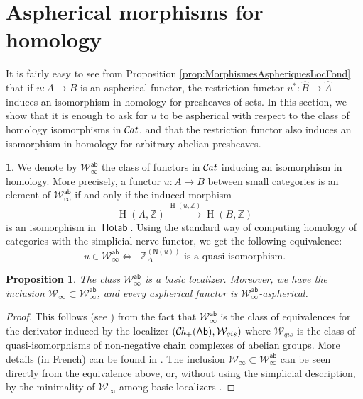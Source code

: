 \documentclass[10pt, english, a4paper, nothms]{amsart}
\theoremstyle{plain}
\newtheorem{prop}[theorem]{Proposition}
\theoremstyle{remark}
\theoremstyle{definition}
\newtheorem{paragr}[theorem]{}
\numberwithin{equation}{theorem}
\newcommand\Z{\mathbb{Z}}
\newcommand{\Cat}{{\mathcal{C}\mspace{-2.mu}\it{at}}}
\newcommand{\Ch}{{\mathcal{C}\mspace{-2.mu}\it{h}_{+}}}
\newcommand{\pref}[1]{{\widehat{ #1 }}}
\newcommand{\W}{\mathcal{W}}
\newcommand{\Hotab}{\operatorname{\mathsf{Hotab}}}
\newcommand{\Ab}{{\mathsf{Ab}}}
\newcommand{\ab}{{\mathsf{ab}}}
\newcommand{\Wh}[2]{\Z_{#1}^{\left(#2\right)}}
\renewcommand{\H}[2]{\operatorname{{H}}(#1,#2)}
\newcommand{\Wab}{\W^{\ab}}
\DeclareMathOperator{\dk}{\mathsf{C}_N}
\newcommand{\nerf}{\mathsf{N}}
\begin{document}
\section{Aspherical morphisms for homology}
\label{sec:asphericalMorphisms}

It is fairly easy to see from Proposition
\ref{prop:MorphismesAspheriquesLocFond} that if $u : A \to B$ is an aspherical
functor, the restriction functor $u^* : \pref{B} \to \pref{A}$ induces an
isomorphism in homology for presheaves of sets. In this section, we show that it
is enough to ask for $u$ to be aspherical with respect to the class of homology
isomorphisms in $\Cat$, and that the restriction functor also induces an
isomorphism in homology for arbitrary abelian presheaves.


\begin{paragr}
We denote by $\Wab_\infty$ the class of functors in $\Cat$ inducing an
isomorphism in homology. More precisely, a functor $u: A \to B$
between small categories is an element of $\Wab_\infty$ if and only if
the induced morphism 
\[
\H{A}{\Z} \xrightarrow{\H{u}{\Z}} \H{B}{\Z} 
\]
is an isomorphism in $\Hotab$. Using the standard way of computing
homology of categories with the simplicial nerve functor, we get the following
equivalence: 
\[
u \in \Wab_\infty \iff \dk\Wh{\Delta}{\nerf(u)} \text{ is a quasi-isomorphism.}
\]
\end{paragr}

\begin{prop}\label{prop:asphericalAbAspherical}
The class $\Wab_\infty$ is a basic localizer. Moreover, we have the
inclusion $\W_\infty \subset \Wab_{\infty}$, and every aspherical
functor is $\W_\infty^\ab$-aspherical.
\end{prop}

\begin{proof}
This follows (see \cite[Corollary
1.5.14]{maltsiniotis2001derivateurs}) from the fact that $\Wab_\infty$
is the class of equivalences for the derivator induced by the
localizer $(\Ch(\Ab), \W_{qis})$ where $\W_{qis}$ is the class of
quasi-isomorphisms of non-negative chain complexes of abelian groups.
More details (in French) can be found in
\cite[annexe~A]{hubert2025phd}. The inclusion $\W_\infty \subset
\Wab_\infty$ can be seen directly from the equivalence above, or,
without using the simplicial description, by the minimality of
$\W_\infty$ among basic localizers \cite{cisinski2004localisateur}.
\end{proof}
\end{document}
